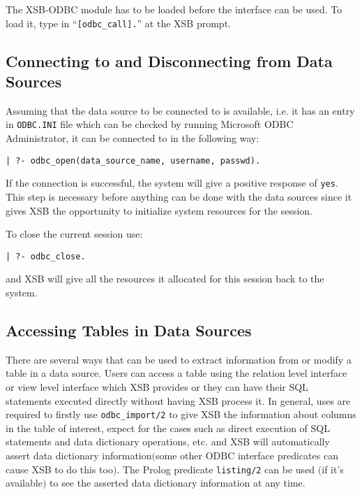 The XSB-ODBC module has to be loaded before the interface can be used.  
To load it, type in ``{\tt [odbc\_call].}'' at the XSB prompt.

\subsection{Connecting to and Disconnecting from Data Sources}

Assuming that the data source to be connected to is available, i.e. it has an 
entry in {\tt ODBC.INI} file which can be checked by running Microsoft 
ODBC Administrator, it can be connected to in the following way: 

\begin{center}
{\tt  | ?- odbc\_open(data\_source\_name, username, passwd).}
\end{center}

If the connection is successful, the system will give a positive response of 
{\tt yes}.  This step is necessary before anything can be done with the data 
sources since it gives XSB the opportunity to initialize system resources for 
the session.

To close the current session use:
\begin{center}
{\tt  | ?- odbc\_close.}
\end{center}

and XSB will give all the resources  it allocated for this session back to the
system.

\subsection{Accessing Tables in Data Sources}

There are several ways that can be used to extract information from or modify 
a table in a data source.  Users can access a table using the relation level interface 
or view level interface which XSB provides or they can have their SQL statements 
executed directly without having XSB process it.  In general,  uses are required 
to firstly use {\tt odbc\_import/2} to give XSB the information about columns 
in the table of interest, expect for the cases such as direct execution of SQL 
statements and data dictionary operations, etc. and XSB will automatically assert 
data dictionary information$($some other ODBC interface predicates can 
cause XSB to do this too$)$. The Prolog predicate {\tt listing/2} can be used
$($if it's available$)$ to see the asserted data dictionary information at any time.  

